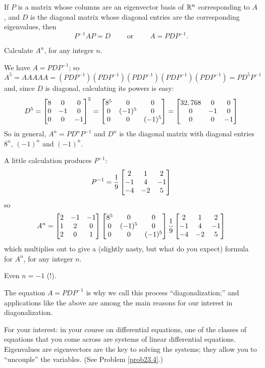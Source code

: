 \begin{proposition}
If $P$ is a matrix whose columns are an eigenvector basis of $\mathbb{R}^n$
corresponding to $A$, and $D$ is the diagonal matrix whose diagonal
entries are the corresponding eigenvalues, then
$$
 P^{-1}AP=D\qquad \text{ or }\qquad A = PDP^{-1}.
$$
\end{proposition}

\begin{myprob}
Calculate $A^n$, for any integer $n$.

\begin{mysol}
We have $A = PDP^{-1}$; so 
$$
A^5 = AAAAA = (PDP^{-1})(PDP^{-1})(PDP^{-1})(PDP^{-1})(PDP^{-1}) = PD^5P^{-1}
$$
and, since $D$ is diagonal, calculating its powers is easy:
$$
D^5 = \left[ \begin{matrix} 8 & 0 & 0\\  0 & -1 & 0\\ 0 & 0 & -1 \end{matrix} \right]^5 = 
\left[ \begin{matrix} 8^5 & 0 & 0\\ 0 & (-1)^5 & 0 \\ 0 & 0 & (-1)^5 \end{matrix} \right]
= \left[ \begin{matrix} 32,768 & 0 & 0\\  0 & -1 & 0\\ 0 & 0 & -1 \end{matrix} \right]
$$
So in general, $A^n = PD^n P^{-1}$ and $D^n$ is the diagonal
matrix with diagonal entries $8^n$, $(-1)^n$ and $(-1)^n$.

A little calculation produces $P^{-1}$:
$$
P^{-1} = \frac19 \left[ \begin{matrix} 2&1&2\\-1&4&-1\\-4&-2&5 \end{matrix} \right]
$$
so 
$$
A^n = \left[ \begin{matrix} 2 & -1 & -1 \\ 1 & 2 & 0\\ 2 & 0 & 1 \end{matrix} \right]\left[ \begin{matrix} 8^5 & 0 & 0\\ 0 & (-1)^5 & 0 \\ 0 & 0 & (-1)^5 \end{matrix} \right]\frac19 \left[ \begin{matrix} 2&1&2\\-1&4&-1\\-4&-2&5 \end{matrix} \right]
$$
which multiplies out to give a (slightly nasty, but what do you
expect) formula for $A^n$, for any integer $n$.

Even $n=-1$ (!).
\end{mysol} \end{myprob}


The equation $A = PDP^{-1}$ is why we call this process ``diagonalization;''
and applications like the above are among the main reasons for our
interest in diagonalization.

For your interest:  in your course on differential equations, one
of the classes of equations that you come across are systems of
linear differential equations.  Eigenvalues are eigenvectors
are the key to solving the systems; they allow you to ``uncouple'' the
variables.  (See Problem \ref{prob23.4}.)   


